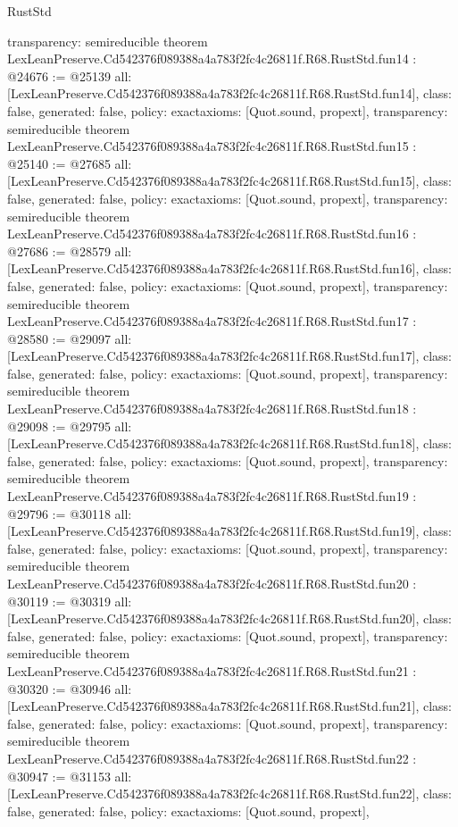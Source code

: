 \begin{lexlean}{RustStd}
\begin{coremodule}
{  transparency: semireducible
}
theorem LexLeanPreserve.Cd542376f089388a4a783f2fc4c26811f.R68.RustStd.fun14 : @24676 := @25139 {
  all: [LexLeanPreserve.Cd542376f089388a4a783f2fc4c26811f.R68.RustStd.fun14],
  class: false,
  generated: false,
  policy: exact{axioms: [Quot.sound, propext]},
  transparency: semireducible
}
theorem LexLeanPreserve.Cd542376f089388a4a783f2fc4c26811f.R68.RustStd.fun15 : @25140 := @27685 {
  all: [LexLeanPreserve.Cd542376f089388a4a783f2fc4c26811f.R68.RustStd.fun15],
  class: false,
  generated: false,
  policy: exact{axioms: [Quot.sound, propext]},
  transparency: semireducible
}
theorem LexLeanPreserve.Cd542376f089388a4a783f2fc4c26811f.R68.RustStd.fun16 : @27686 := @28579 {
  all: [LexLeanPreserve.Cd542376f089388a4a783f2fc4c26811f.R68.RustStd.fun16],
  class: false,
  generated: false,
  policy: exact{axioms: [Quot.sound, propext]},
  transparency: semireducible
}
theorem LexLeanPreserve.Cd542376f089388a4a783f2fc4c26811f.R68.RustStd.fun17 : @28580 := @29097 {
  all: [LexLeanPreserve.Cd542376f089388a4a783f2fc4c26811f.R68.RustStd.fun17],
  class: false,
  generated: false,
  policy: exact{axioms: [Quot.sound, propext]},
  transparency: semireducible
}
theorem LexLeanPreserve.Cd542376f089388a4a783f2fc4c26811f.R68.RustStd.fun18 : @29098 := @29795 {
  all: [LexLeanPreserve.Cd542376f089388a4a783f2fc4c26811f.R68.RustStd.fun18],
  class: false,
  generated: false,
  policy: exact{axioms: [Quot.sound, propext]},
  transparency: semireducible
}
theorem LexLeanPreserve.Cd542376f089388a4a783f2fc4c26811f.R68.RustStd.fun19 : @29796 := @30118 {
  all: [LexLeanPreserve.Cd542376f089388a4a783f2fc4c26811f.R68.RustStd.fun19],
  class: false,
  generated: false,
  policy: exact{axioms: [Quot.sound, propext]},
  transparency: semireducible
}
theorem LexLeanPreserve.Cd542376f089388a4a783f2fc4c26811f.R68.RustStd.fun20 : @30119 := @30319 {
  all: [LexLeanPreserve.Cd542376f089388a4a783f2fc4c26811f.R68.RustStd.fun20],
  class: false,
  generated: false,
  policy: exact{axioms: [Quot.sound, propext]},
  transparency: semireducible
}
theorem LexLeanPreserve.Cd542376f089388a4a783f2fc4c26811f.R68.RustStd.fun21 : @30320 := @30946 {
  all: [LexLeanPreserve.Cd542376f089388a4a783f2fc4c26811f.R68.RustStd.fun21],
  class: false,
  generated: false,
  policy: exact{axioms: [Quot.sound, propext]},
  transparency: semireducible
}
theorem LexLeanPreserve.Cd542376f089388a4a783f2fc4c26811f.R68.RustStd.fun22 : @30947 := @31153 {
  all: [LexLeanPreserve.Cd542376f089388a4a783f2fc4c26811f.R68.RustStd.fun22],
  class: false,
  generated: false,
  policy: exact{axioms: [Quot.sound, propext]},
}
\end{coremodule}
\end{lexlean}
